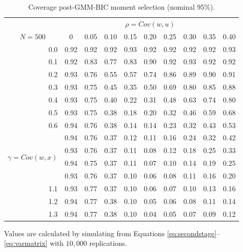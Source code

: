 \documentclass[12pt]{article}
\theoremstyle{definition}
\begin{document}
\begin{table}[!tbp]
\caption{Coverage post-GMM-BIC moment selection (nominal 95\%).}
\label{tab:BICcov}
\small
 \begin{center}
 \begin{tabular}{r|rrrrrrrrr}\hline\hline
&\multicolumn{9}{c}{$\rho = Cov(w,u)$}\\
\multicolumn{1}{c|}{$N = 500$}&\multicolumn{1}{c}{0}&\multicolumn{1}{c}{0.05}&\multicolumn{1}{c}{0.10}&\multicolumn{1}{c}{0.15}&\multicolumn{1}{c}{0.20}&\multicolumn{1}{c}{0.25}&\multicolumn{1}{c}{0.30}&\multicolumn{1}{c}{0.35}&\multicolumn{1}{c}{0.40}\tabularnewline
\hline
0.0&0.92&0.92&0.92&0.93&0.92&0.92&0.92&0.92&0.93\tabularnewline
0.1&0.92&0.83&0.77&0.83&0.90&0.92&0.93&0.92&0.92\tabularnewline
0.2&0.93&0.76&0.55&0.57&0.74&0.86&0.89&0.90&0.91\tabularnewline
0.3&0.93&0.75&0.45&0.35&0.50&0.69&0.80&0.85&0.88\tabularnewline
0.4&0.93&0.75&0.40&0.22&0.31&0.48&0.63&0.74&0.80\tabularnewline
0.5&0.93&0.75&0.38&0.18&0.20&0.32&0.46&0.59&0.68\tabularnewline
0.6&0.94&0.76&0.38&0.14&0.14&0.23&0.32&0.43&0.53\tabularnewline
\multirow{4}{5mm}{\begin{sideways}\parbox{1mm}{$\gamma\;$=$\;Cov(w,x)$}\end{sideways}}
0.7&0.94&0.76&0.37&0.12&0.11&0.16&0.24&0.32&0.42\tabularnewline
0.8&0.93&0.76&0.37&0.11&0.08&0.12&0.18&0.25&0.33\tabularnewline
0.9&0.94&0.75&0.37&0.11&0.07&0.10&0.14&0.19&0.25\tabularnewline
1.0&0.93&0.76&0.37&0.10&0.06&0.08&0.11&0.16&0.20\tabularnewline
1.1&0.93&0.77&0.37&0.10&0.06&0.07&0.10&0.13&0.16\tabularnewline
1.2&0.94&0.77&0.38&0.10&0.05&0.06&0.08&0.11&0.14\tabularnewline
1.3&0.94&0.77&0.38&0.10&0.04&0.05&0.07&0.09&0.12\tabularnewline
\hline
\end{tabular}
\end{center}
\footnotesize
\begin{tablenotes}
\item Values are calculated by simulating from Equations \ref{eq:secondstage}--\ref{eq:varmatrix} with $10,000$ replications.
\end{tablenotes}
\end{table}
\end{document}
